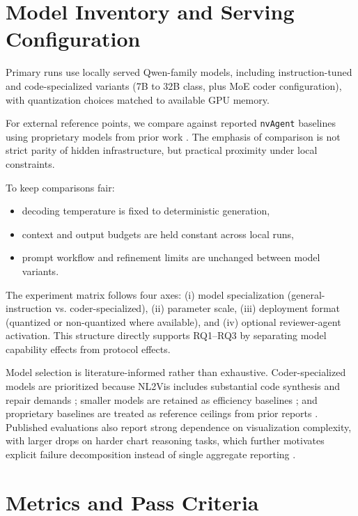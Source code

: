 \documentclass[a4paper,oneside,bibliography=totoc]{scrbook}
\begin{document}
\section{Model Inventory and Serving Configuration}
\label{sec:models_baselines}

Primary runs use locally served Qwen-family models, including instruction-tuned and code-specialized variants (7B to 32B class, plus MoE coder configuration), with quantization choices matched to available GPU memory.

For external reference points, we compare against reported \texttt{nvAgent} baselines using proprietary models from prior work \cite{ouyang2025nvagent}. The emphasis of comparison is not strict parity of hidden infrastructure, but practical proximity under local constraints.

To keep comparisons fair:
\begin{itemize}
  \item decoding temperature is fixed to deterministic generation,
  \item context and output budgets are held constant across local runs,
  \item prompt workflow and refinement limits are unchanged between model variants.
\end{itemize}

The experiment matrix follows four axes: (i) model specialization (general-instruction vs. coder-specialized), (ii) parameter scale, (iii) deployment format (quantized or non-quantized where available), and (iv) optional reviewer-agent activation. This structure directly supports RQ1--RQ3 by separating model capability effects from protocol effects.

Model selection is literature-informed rather than exhaustive. Coder-specialized models are prioritized because NL2Vis includes substantial code synthesis and repair demands \cite{wu2024automated}; smaller models are retained as efficiency baselines \cite{voigt2024plots}; and proprietary baselines are treated as reference ceilings from prior reports \cite{ouyang2025nvagent}.
Published evaluations also report strong dependence on visualization complexity, with larger drops on harder chart reasoning tasks, which further motivates explicit failure decomposition instead of single aggregate reporting \cite{khan2025llmvis}.

\section{Metrics and Pass Criteria}
\label{sec:metrics}
\end{document}
